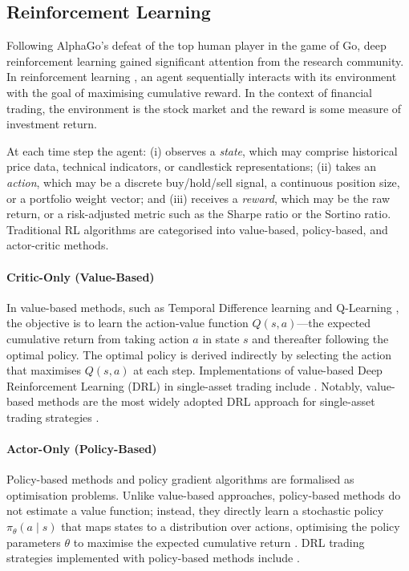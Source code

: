\documentclass[conference]{IEEEtran}
\begin{document}
\subsection{Reinforcement Learning}
\label{sec:rl}

Following AlphaGo's \cite{silver2016mastering} defeat of the top human player in the game
of Go, deep reinforcement learning gained significant attention from the research community.
In reinforcement learning \cite{sutton2018rl}, an agent sequentially interacts with its
environment with the goal of maximising cumulative reward. In the context of financial
trading, the environment is the stock market and the reward is some measure of investment
return.

At each time step the agent: (i) observes a \emph{state}, which may comprise historical
price data, technical indicators, or candlestick representations; (ii) takes an
\emph{action}, which may be a discrete buy/hold/sell signal, a continuous position size, or
a portfolio weight vector; and (iii) receives a \emph{reward}, which may be the raw return,
or a risk-adjusted metric such as the Sharpe ratio or the Sortino ratio. Traditional RL
algorithms are categorised into value-based, policy-based, and actor-critic methods.

\paragraph{Critic-Only (Value-Based)}
\label{sec:value-based}

In value-based methods, such as Temporal Difference learning \cite{sutton1988td} and
Q-Learning \cite{watkins1992qlearning}, the objective is to learn the action-value function
$Q(s, a)$---the expected cumulative return from taking action $a$ in state $s$ and thereafter
following the optimal policy. The optimal policy is derived indirectly by selecting the
action that maximises $Q(s, a)$ at each step. Implementations of value-based Deep
Reinforcement Learning (DRL) in single-asset trading include
\cite{carta2021,huang2023drl,taghian2022,theate2021,ye2023}.
Notably, value-based methods are the most widely adopted DRL approach for single-asset
trading strategies \cite{huang2024novel}.

\paragraph{Actor-Only (Policy-Based)}
\label{sec:policy-based}

Policy-based methods and policy gradient algorithms are formalised as
optimisation problems. Unlike value-based approaches, policy-based methods do not estimate a
value function; instead, they directly learn a stochastic policy $\pi_\theta(a \mid s)$ that
maps states to a distribution over actions, optimising the policy parameters $\theta$ to
maximise the expected cumulative return \cite{sutton1999pg}. DRL trading strategies
implemented with policy-based methods include
\cite{lele2020,liu2021policy,wang2021policy}.
\end{document}
